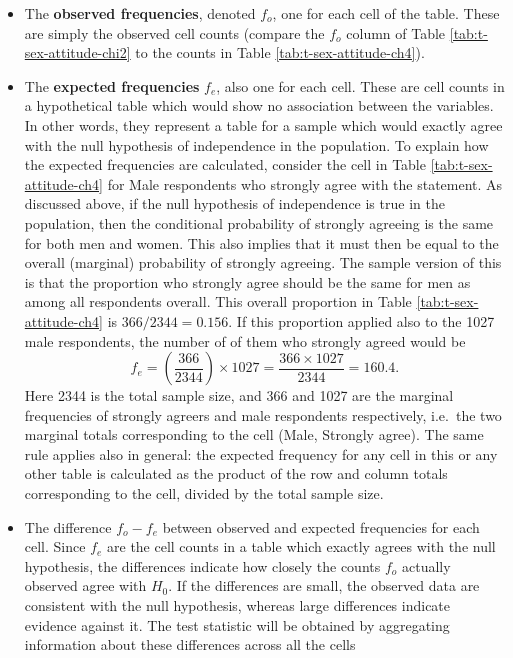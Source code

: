 \documentclass[11pt,a4paper,openany]{book}
\begin{document}
\begin{itemize}
\item
  The \textbf{observed frequencies}, denoted \(f_{o}\), one for each
  cell of the table. These are simply the observed cell counts (compare
  the \(f_{o}\) column of Table \ref{tab:t-sex-attitude-chi2} to the
  counts in Table \ref{tab:t-sex-attitude-ch4}).
\item
  The \textbf{expected frequencies} \(f_{e}\), also one for each cell.
  These are cell counts in a hypothetical table which would show no
  association between the variables. In other words, they represent a
  table for a sample which would exactly agree with the null hypothesis
  of independence in the population. To explain how the expected
  frequencies are calculated, consider the cell in Table
  \ref{tab:t-sex-attitude-ch4} for Male respondents who strongly agree
  with the statement. As discussed above, if the null hypothesis of
  independence is true in the population, then the conditional
  probability of strongly agreeing is the same for both men and women.
  This also implies that it must then be equal to the overall (marginal)
  probability of strongly agreeing. The sample version of this is that
  the proportion who strongly agree should be the same for men as among
  all respondents overall. This overall proportion in Table
  \ref{tab:t-sex-attitude-ch4} is \(366/2344=0.156\). If this proportion
  applied also to the 1027 male respondents, the number of of them who
  strongly agreed would be
  \[f_{e} = \left(\frac{366}{2344}\right)\times 1027 =
  \frac{366\times 1027}{2344}=160.4.\] Here 2344 is the total sample
  size, and 366 and 1027 are the marginal frequencies of strongly
  agreers and male respondents respectively, i.e.~the two marginal
  totals corresponding to the cell (Male, Strongly agree). The same rule
  applies also in general: the expected frequency for any cell in this
  or any other table is calculated as the product of the row and column
  totals corresponding to the cell, divided by the total sample size.
\item
  The difference \(f_{o}-f_{e}\) between observed and expected
  frequencies for each cell. Since \(f_{e}\) are the cell counts in a
  table which exactly agrees with the null hypothesis, the differences
  indicate how closely the counts \(f_{o}\) actually observed agree with
  \(H_{0}\). If the differences are small, the observed data are
  consistent with the null hypothesis, whereas large differences
  indicate evidence against it. The test statistic will be obtained by
  aggregating information about these differences across all the cells

\end{itemize}
\end{document}

